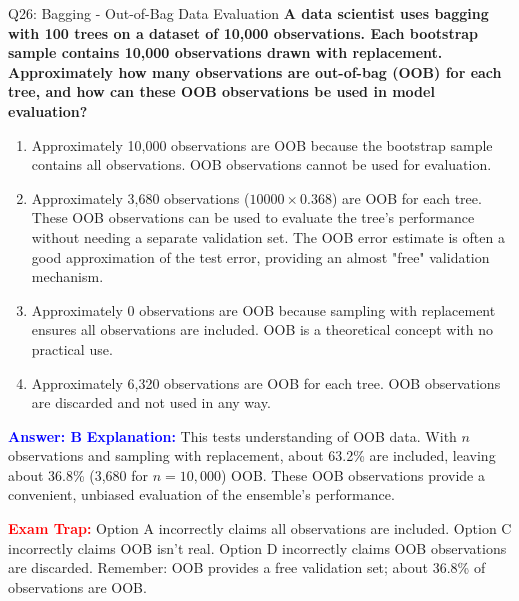 \documentclass[8pt]{beamer}
\begin{document}
	
	\begin{frame}{Q26: Bagging - Out-of-Bag Data Evaluation}
		\fontsize{6.5}{7.5}\selectfont
		\textbf{A data scientist uses bagging with 100 trees on a dataset of 10,000 observations. Each bootstrap sample contains 10,000 observations drawn with replacement. Approximately how many observations are out-of-bag (OOB) for each tree, and how can these OOB observations be used in model evaluation?}
		
		\begin{enumerate}
			\item Approximately 10,000 observations are OOB because the bootstrap sample contains all observations. OOB observations cannot be used for evaluation.
			\item Approximately 3,680 observations ($10000 \times 0.368$) are OOB for each tree. These OOB observations can be used to evaluate the tree's performance without needing a separate validation set. The OOB error estimate is often a good approximation of the test error, providing an almost "free" validation mechanism.
			\item Approximately 0 observations are OOB because sampling with replacement ensures all observations are included. OOB is a theoretical concept with no practical use.
			\item Approximately 6,320 observations are OOB for each tree. OOB observations are discarded and not used in any way.
		\end{enumerate}
		
		\vspace{0.1cm}
		\textcolor{blue}{\textbf{Answer: B}}
		\vspace{0.1cm}
		\textcolor{blue}{\textbf{Explanation:}} This tests understanding of OOB data. With $n$ observations and sampling with replacement, about 63.2\% are included, leaving about 36.8\% (3,680 for $n=10,000$) OOB. These OOB observations provide a convenient, unbiased evaluation of the ensemble's performance.
		
		\textcolor{red}{\textbf{Exam Trap:}} Option A incorrectly claims all observations are included. Option C incorrectly claims OOB isn't real. Option D incorrectly claims OOB observations are discarded. Remember: OOB provides a free validation set; about 36.8\% of observations are OOB.
	\end{frame}
	
\end{document}
